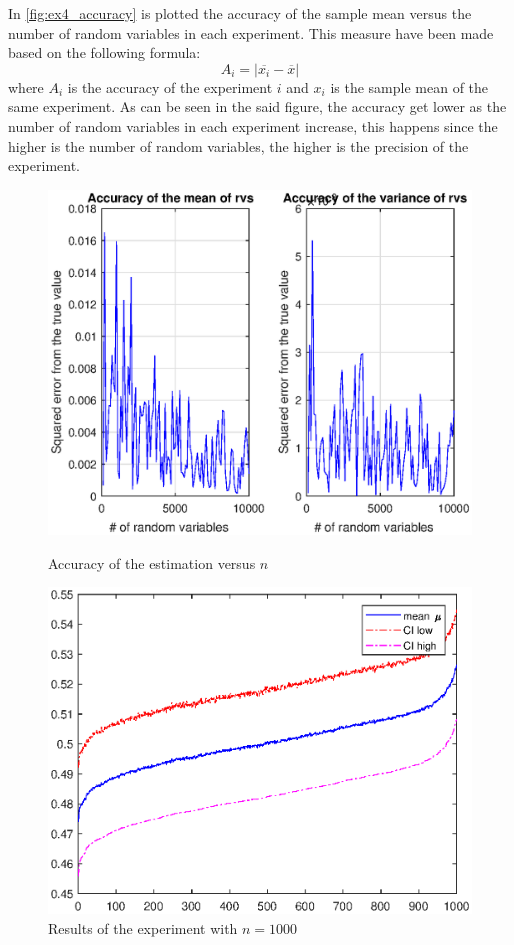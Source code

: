 \documentclass[11pt,a4paper]{article}
\begin{document}
In \autoref{fig:ex4_accuracy} is plotted the accuracy of the sample mean versus the number of random variables in each experiment. This measure have been made based on the following formula:
\begin{equation}
  A_i = |\overline{x_i} - \overline{x}|
\end{equation}
where $A_i$ is the accuracy of the experiment $i$ and $x_i$ is the sample mean of the same experiment. As can be seen in the said figure, the accuracy get lower as the number of random variables in each experiment increase, this happens since the higher is the number of random variables, the higher is the precision of the experiment.
\begin{figure}[ht]
	\centering
	\begin{minipage}{0.45\textwidth}
		\centering
		\includegraphics[width=\textwidth]{ex4_accuracy}
		\caption{Accuracy of the estimation versus $n$}
		\label{fig:ex4_accuracy}
	\end{minipage}
	\begin{minipage}{0.45\textwidth}
		\centering
		\includegraphics[width=\textwidth]{CI_10002}
		\caption{Results of the experiment with $n=1000$}
		\label{fig:CI_10002}
	\end{minipage}
\end{figure}
\end{document}
